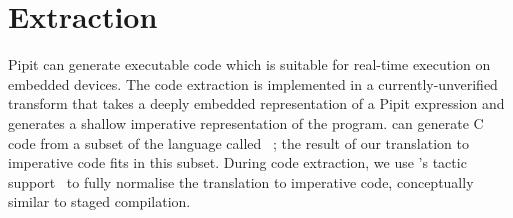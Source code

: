 

\section{Extraction}
\label{s:extraction}

Pipit can generate executable code which is suitable for real-time execution on embedded devices.
The code extraction is implemented in a currently-unverified transform that takes a deeply embedded representation of a Pipit expression and generates a shallow imperative representation of the program.
\fstar{} can generate C code from a subset of the language called \lowstar{}~\cite{protzenko2017verified}; the result of our translation to imperative code fits in this subset.
During code extraction, we use \fstar{}'s tactic support~\cite{martinez2019meta} to fully normalise the translation to imperative code, conceptually similar to staged compilation.





